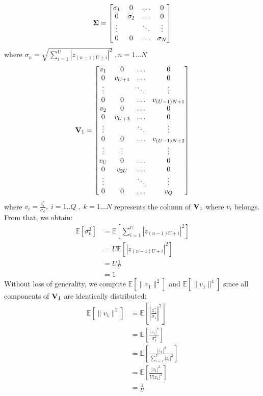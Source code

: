 \documentclass[12pt]{article}
\begin{document}
\begin{equation}
	\boldsymbol{\mathrm{\Sigma}} =
	\begin{bmatrix}
		\sigma_1 & 0 &\hdots & 0 \\
		0 & \sigma_2 & \hdots & 0 \\
		\vdots &  &\ddots &  \vdots \\
		0 & 0 & \hdots & \sigma_N
	\end{bmatrix}
\end{equation}
where $\sigma_n = \sqrt{\sum_{i=1}^{U} \left| z_{(n-1)U+i}\right|^2} \; , n = 1...N$
\begin{equation}
	\boldsymbol{\mathrm{V}}_1 = 
	\begin{bmatrix}
		v_1  & 0 & \hdots & 0 \\
		0 & v_{U+1} &  \hdots & 0 \\
		\vdots & & \ddots &  \vdots \\
		0 & 0 & \hdots & v_{(U-1)N+1} \\
		v_2 & 0 & \hdots & 0 \\
		0  & v_{U+2} & \hdots & 0\\
		\vdots & &\ddots &  \vdots\\
		0 & 0 & \hdots & v_{(U-1)N+2} \\
		\vdots & \vdots & &  \vdots\\	
		v_U  & 0 & \hdots & 0 \\
		0 & v_{2U} & \hdots & 0 \\
		\vdots &  & \ddots & \vdots\\
		0 & 0  & \hdots & v_Q
	\end{bmatrix}
\end{equation}
where $v_i  = \frac{z_i^*}{\sigma_k}, \; i = 1..Q \; , \; k = 1...N$ represents the column of $\boldsymbol{\mathrm{V}}_1$ where $v_i$ belongs. \\
From that, we obtain:
\begin{align}
	\mathbb{E} \left[\sigma_n^2 \right] &= \mathbb{E}\left[ \sum_{i=1}^{U} \left| z_{(n-1)U+i}\right|^2 \right]  \\
	 & = U \mathbb{E} \left[ \left| z_{(n-1)U+i}\right|^2 \right] \\
	 &= U \frac{1}{U} \\
	 & = 1
\end{align}
Without loss of generality, we  compute $\mathbb{E} \left[ \| v_1\|^2 \right]$ and $\mathbb{E} \left[ \| v_1\|^4 \right]$ since all components of $\boldsymbol{\mathrm{V}}_1$ are identically distributed:
\begin{align}
\mathbb{E} \left[ \| v_1\|^2 \right] &= \mathbb{E}\left[ \left| \frac{z_1^*}{\sigma_1}\right|^2\right]  \\
& =  \mathbb{E} \left[ \frac{\left| z_1 \right|^2 }{\sigma_1^2} \right] \\
&=  \mathbb{E} \left[   \frac{\left| z_1 \right|^2 }{  \sum_{i=1}^{U} \left| z_i\right|^2 }  \right] \\
& = \mathbb{E} \left[   \frac{\left| z_1 \right|^2 }{  U \left| z_1 \right|^2 }  \right] \\
& = \frac{1}{U}
\end{align}
\end{document}
